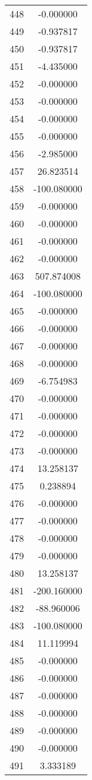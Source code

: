 \documentclass[12pt]{article}
\begin{document}
\begin{longtable}{@{}cc@{}}
448 & -0.000000 \\
449 & -0.937817 \\
450 & -0.937817 \\
451 & -4.435000 \\
452 & -0.000000 \\
453 & -0.000000 \\
454 & -0.000000 \\
455 & -0.000000 \\
456 & -2.985000 \\
457 & 26.823514 \\
458 & -100.080000 \\
459 & -0.000000 \\
460 & -0.000000 \\
461 & -0.000000 \\
462 & -0.000000 \\
463 & 507.874008 \\
464 & -100.080000 \\
465 & -0.000000 \\
466 & -0.000000 \\
467 & -0.000000 \\
468 & -0.000000 \\
469 & -6.754983 \\
470 & -0.000000 \\
471 & -0.000000 \\
472 & -0.000000 \\
473 & -0.000000 \\
474 & 13.258137 \\
475 & 0.238894 \\
476 & -0.000000 \\
477 & -0.000000 \\
478 & -0.000000 \\
479 & -0.000000 \\
480 & 13.258137 \\
481 & -200.160000 \\
482 & -88.960006 \\
483 & -100.080000 \\
484 & 11.119994 \\
485 & -0.000000 \\
486 & -0.000000 \\
487 & -0.000000 \\
488 & -0.000000 \\
489 & -0.000000 \\
490 & -0.000000 \\
491 & 3.333189 \\

\end{longtable}
\end{document}
